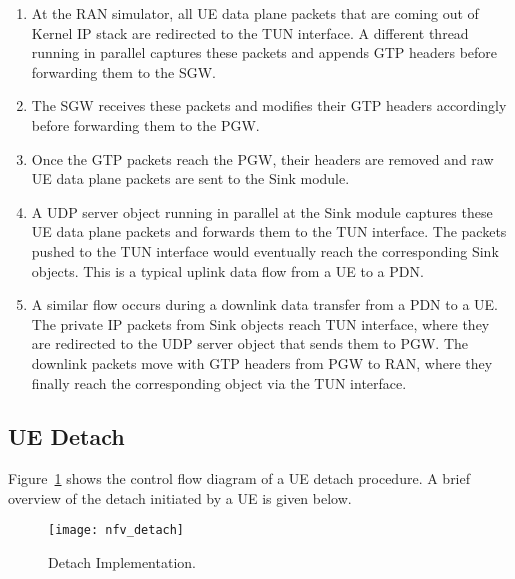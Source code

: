 \documentclass[hidelinks]{report}
\begin{document}
\begin{enumerate}

\item At the RAN simulator, all UE data plane packets that are coming out of Kernel IP stack are redirected to the TUN interface. A different thread running in parallel captures these packets and appends GTP headers before forwarding them to the SGW.

\item The SGW receives these packets and modifies their GTP headers accordingly before forwarding them to the PGW.

\item Once the GTP packets reach the PGW, their headers are removed and raw UE data plane packets are sent to the Sink module.

\item A UDP server object running in parallel at the Sink module captures these UE data plane packets and forwards them to the TUN interface. The packets pushed to the TUN interface would eventually reach the corresponding Sink objects. This is a typical uplink data flow from a UE to a PDN.

\item A similar flow occurs during a downlink data transfer from a PDN to a UE. The private IP packets from Sink objects reach TUN interface, where they are redirected to the UDP server object that sends them to PGW. The downlink packets move with GTP headers from PGW to RAN, where they finally reach the corresponding object via the TUN interface.

\end{enumerate}

\subsection*{UE Detach}

Figure~\ref{nfv_detach} shows the control flow diagram of a UE detach procedure. A brief overview of the detach initiated by a UE is given below.

\begin{figure}[h]

\centering
\texttt{[image: nfv\_detach]}
\caption{Detach Implementation.}
\label{nfv_detach}

\end{figure}
\end{document}
